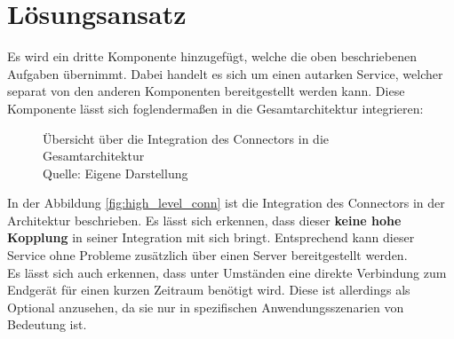 \section{Lösungsansatz}

Es wird ein dritte Komponente hinzugefügt, welche die oben beschriebenen Aufgaben übernimmt. Dabei handelt es sich um einen autarken Service, welcher separat von den anderen Komponenten bereitgestellt werden kann. Diese Komponente lässt sich foglendermaßen in die Gesamtarchitektur integrieren:

\begin{figure}[h]
    \centering
    \caption{Übersicht über die Integration des Connectors in die Gesamtarchitektur\\Quelle: Eigene Darstellung}
    \label{fig:high_level_conn}
\end{figure}

In der Abbildung \vref{fig:high_level_conn} ist die Integration des Connectors in der Architektur beschrieben. Es lässt sich erkennen, dass dieser \textbf{keine hohe Kopplung} in seiner Integration mit sich bringt. Entsprechend kann dieser Service ohne Probleme zusätzlich über einen Server bereitgestellt werden. \\
Es lässt sich auch erkennen, dass unter Umständen eine direkte Verbindung zum Endgerät für einen kurzen Zeitraum benötigt wird. Diese ist allerdings als Optional anzusehen, da sie nur in spezifischen Anwendungsszenarien von Bedeutung ist.

